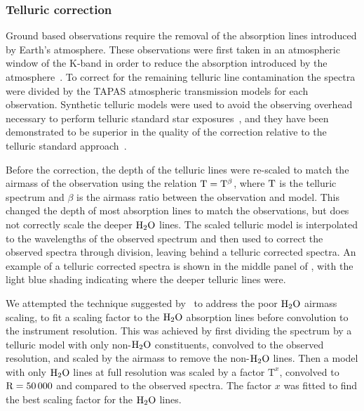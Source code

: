 \subsubsection{Telluric correction}
\label{subsec:telluric_correction}
Ground based observations require the removal of the absorption lines introduced by Earth's atmosphere. These observations were first taken in an atmospheric window of the K-band in order to reduce the absorption introduced by the atmosphere~\citep{barnes_hd_2008}. 
 To correct for the remaining telluric line contamination the spectra were divided by the TAPAS\citep{bertaux_tapas_2014} atmospheric transmission models for each observation. Synthetic telluric models were used to avoid the observing overhead necessary to perform telluric standard star exposures~\citep{vacca_method_2003}, and they have been demonstrated to be superior in the quality of the correction relative to the telluric standard approach~\citep[e.g.][]{cotton_atmospheric_2014}.

Before the correction, the depth of the telluric lines were re-scaled to match the airmass of the observation using the relation \(\rm T = T^{\beta} \), where \(\rm T\) is the telluric spectrum and \(\beta \) is the airmass ratio between the observation and model. This changed the depth of most absorption lines to match the observations, but does not correctly scale the deeper \(\rm H_{2}O \) lines. The scaled telluric model is interpolated to the wavelengths of the observed spectrum and then used to correct the observed spectra through division, leaving behind a telluric corrected spectra. An example of a telluric corrected spectra is shown in the middle panel of , with the light blue shading indicating where the deeper telluric lines were.

We attempted the technique suggested by~\citet{bertaux_tapas_2014} to address the poor \(\rm H_{2}O \) airmass scaling, to fit a scaling factor to the \(\rm {H}_{2}O \) absorption lines before convolution to the instrument resolution. This was achieved by first dividing the spectrum by a telluric model with only non-\(\rm H_{2}O \) constituents, convolved to the observed resolution, and scaled by the airmass to remove the non-\(\rm H_{2}O \) lines. Then a model with only \(\rm H_{2}O \) lines at full resolution was scaled by a factor \(\textrm{T}^{x} \), convolved to \(\rm R=50\,000 \) and compared to the observed spectra. The factor \(x \) was fitted to find the best scaling factor for the \(\rm H_{2}O \) lines.


